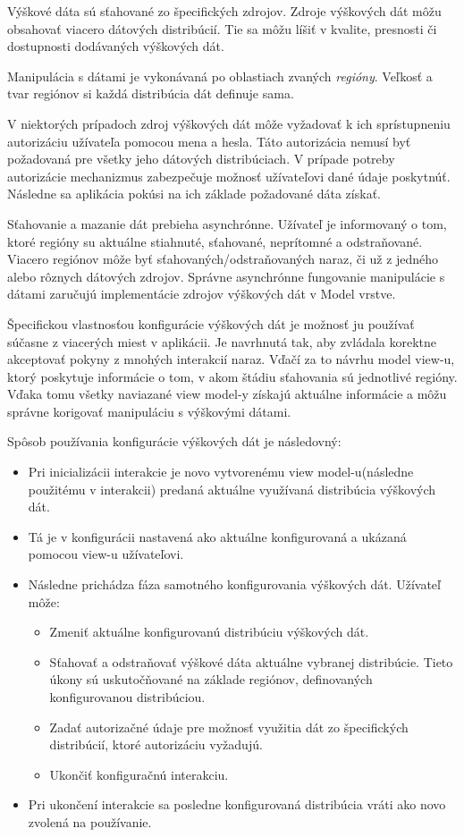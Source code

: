Výškové dáta sú sťahované zo špecifických zdrojov. Zdroje výškových dát môžu obsahovať viacero dátových distribúcií. Tie sa môžu líšiť v kvalite, presnosti či dostupnosti dodávaných výškových dát. 

Manipulácia s dátami je vykonávaná po oblastiach zvaných \textit{regióny}. Veľkosť a tvar regiónov si každá distribúcia dát definuje sama. 

V niektorých prípadoch zdroj výškových dát môže vyžadovať k ich sprístupneniu autorizáciu užívateľa pomocou mena a hesla. Táto autorizácia nemusí byť požadovaná pre všetky jeho dátových distribúciach. V prípade potreby autorizácie mechanizmus zabezpečuje možnosť užívateľovi dané údaje poskytnúť. Následne sa aplikácia pokúsi na ich základe požadované dáta získať.   

Sťahovanie a mazanie dát prebieha asynchrónne. Užívateľ je informovaný o tom, ktoré regióny su aktuálne stiahnuté, sťahované, neprítomné a odstraňované. Viacero regiónov môže byť sťahovaných/odstraňovaných naraz, či už z jedného alebo rôznych dátových zdrojov. Správne asynchrónne fungovanie manipulácie s dátami zaručujú implementácie zdrojov výškových dát v Model vrstve.

Špecifickou vlastnosťou konfigurácie výškových dát je možnosť ju používať súčasne z viacerých miest v aplikácii. Je navrhnutá tak, aby zvládala korektne akceptovať pokyny z mnohých interakcií naraz. Vďačí za to návrhu model view-u, ktorý poskytuje informácie o tom, v akom štádiu sťahovania sú jednotlivé regióny. Vďaka tomu všetky naviazané view model-y získajú aktuálne informácie a môžu správne korigovať manipuláciu s výškovými dátami.

Spôsob používania konfigurácie výškových dát je následovný:
\begin{itemize}
    \item Pri inicializácii interakcie je novo vytvorenému view model-u(následne použitému v interakcii) predaná aktuálne využívaná distribúcia výškových dát.
    \item Tá je v konfigurácii nastavená ako aktuálne konfigurovaná a ukázaná pomocou view-u užívateľovi.
    \item Následne prichádza fáza samotného konfigurovania výškových dát. Užívateľ môže:
    \begin{itemize}
        \item Zmeniť aktuálne konfigurovanú distribúciu výškových dát.
        \item Sťahovať a odstraňovať výškové dáta aktuálne vybranej distribúcie. Tieto úkony sú uskutočňované na základe regiónov, definovaných konfigurovanou distribúciou.
        \item Zadať autorizačné údaje pre možnosť využitia dát zo špecifických distribúcií, ktoré autorizáciu vyžadujú. 
        \item Ukončiť konfiguračnú interakciu.
    \end{itemize} 
    \item Pri ukončení interakcie sa posledne konfigurovaná distribúcia vráti ako novo zvolená na používanie.
\end{itemize}

